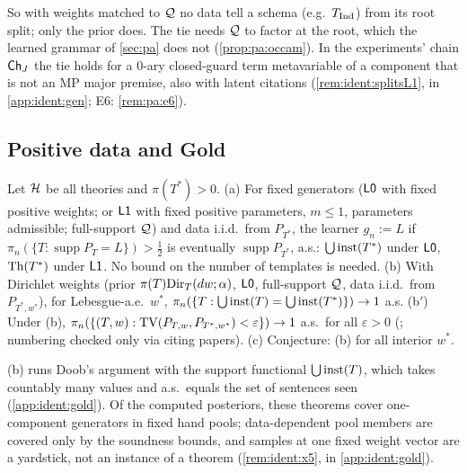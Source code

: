 \noindent So with weights matched to $\mathcal{Q}$ no data tell a schema (e.g.\ $T_{\mathrm{Ind}}$) from its root split; only the prior does. The tie needs $\mathcal{Q}$ to factor at the root, which the learned grammar of \cref{sec:pa} does not (\cref{prop:pa:occam}). In the experiments' chain $\mathsf{Ch}_{J}$ the tie holds for a $0$-ary closed-guard term metavariable of a component that is not an MP major premise, also with latent citations (\cref{rem:ident:splitsL1}, in \cref{app:ident:gen}; E6: \cref{rem:pa:e6}).

\subsection{Positive data and Gold}\label{sec:ident:gold}

\begin{theorem}\label{thm:ident:limit}
Let $\mathcal{H}$ be all theories and $\pi(T^*)>0$.
(a) For fixed generators ($\mathord{\mathsf{L0}}$ with fixed positive weights; or $\mathord{\mathsf{L1}}$ with fixed positive parameters, $m\le1$, parameters admissible; full-support $\mathcal{Q}$) and data i.i.d.\ from $P_{T^*}$, the learner $g_n:=L$ if $\pi_n(\{T:\operatorname{supp}P_T=L\})>\frac12$ is eventually $\operatorname{supp}P_{T^*}$, a.s.: $\bigcup\mathrm{inst}(T^*)$ under $\mathord{\mathsf{L0}}$, $\mathrm{Th}(T^*)$ under $\mathord{\mathsf{L1}}$. No bound on the number of templates is needed.
(b) With Dirichlet weights (prior $\pi(T)\mathrm{Dir}_T(dw;\alpha)$, $\mathord{\mathsf{L0}}$, full-support $\mathcal{Q}$, data i.i.d.\ from $P_{T^*,w^*}$), for Lebesgue-a.e.\ $w^*$, $\pi_n(\{T:\bigcup\mathrm{inst}(T)=\bigcup\mathrm{inst}(T^*)\})\to1$ a.s.
(b$'$) Under (b), $\pi_n(\{(T,w):\mathrm{TV}(P_{T,w},P_{T^*,w^*})<\varepsilon\})\to1$ a.s.\ for all $\varepsilon>0$ (\citealp[Thm~6.9]{ghosal2017fundamentals}; numbering checked only via citing papers).
(c) Conjecture: (b) for all interior $w^*$.
\end{theorem}

\noindent (b) runs Doob's argument with the support functional $\bigcup\mathrm{inst}(T)$, which takes countably many values and a.s.\ equals the set of sentences seen (\cref{app:ident:gold}). Of the computed posteriors, these theorems cover one-component generators in fixed hand pools; data-dependent pool members are covered only by the soundness bounds, and samples at one fixed weight vector are a yardstick, not an instance of a theorem (\cref{rem:ident:x5}, in \cref{app:ident:gold}).

